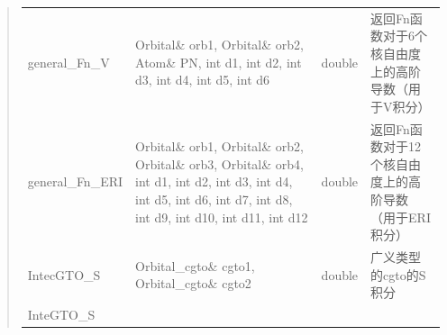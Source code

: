 \documentclass[11pt]{article}
\begin{document}
\begin{quote}
\begin{longtable}[]{@{}llll@{}}
\begin{minipage}[t]{0.17\columnwidth}
general\_Fn\_V\strut
\end{minipage} & \begin{minipage}[t]{0.37\columnwidth}\raggedright\strut
Orbital\& orb1, Orbital\& orb2, Atom\& PN, int d1, int d2, int d3, int
d4, int d5, int d6\strut
\end{minipage} & \begin{minipage}[t]{0.07\columnwidth}\raggedright\strut
double\strut
\end{minipage} & \begin{minipage}[t]{0.27\columnwidth}\raggedright\strut
返回Fn函数对于6个核自由度上的高阶导数（用于V积分）\strut
\end{minipage}\tabularnewline
\begin{minipage}[t]{0.17\columnwidth}\raggedright\strut
general\_Fn\_ERI\strut
\end{minipage} & \begin{minipage}[t]{0.37\columnwidth}\raggedright\strut
Orbital\& orb1, Orbital\& orb2, Orbital\& orb3, Orbital\& orb4, int d1,
int d2, int d3, int d4, int d5, int d6, int d7, int d8, int d9, int d10,
int d11, int d12\strut
\end{minipage} & \begin{minipage}[t]{0.07\columnwidth}\raggedright\strut
double\strut
\end{minipage} & \begin{minipage}[t]{0.27\columnwidth}\raggedright\strut
返回Fn函数对于12个核自由度上的高阶导数（用于ERI积分）\strut
\end{minipage}\tabularnewline
\begin{minipage}[t]{0.17\columnwidth}\raggedright\strut
IntecGTO\_S\strut
\end{minipage} & \begin{minipage}[t]{0.37\columnwidth}\raggedright\strut
Orbital\_cgto\& cgto1, Orbital\_cgto\& cgto2\strut
\end{minipage} & \begin{minipage}[t]{0.07\columnwidth}\raggedright\strut
double\strut
\end{minipage} & \begin{minipage}[t]{0.27\columnwidth}\raggedright\strut
广义类型的cgto的S积分\strut
\end{minipage}\tabularnewline
\begin{minipage}[t]{0.17\columnwidth}\raggedright\strut
InteGTO\_S\strut
\end{minipage} & \begin{minipage}[t]{0.37\columnwidth}\raggedright\strut

\end{minipage}
\end{longtable}
\end{quote}
\end{document}

